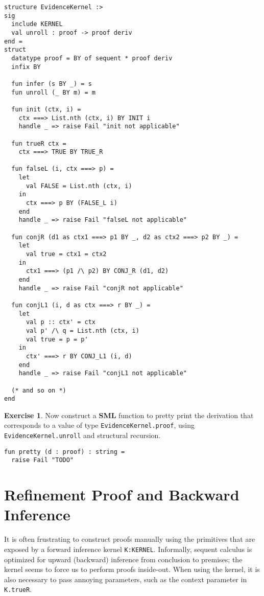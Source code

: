 \documentclass{article}
\newcommand\FormatLang[1]{{\bfseries\sffamily #1}}
\newcommand\SML{\FormatLang{SML}}
\theoremstyle{definition}
\newtheorem{exercise}{Exercise}[section]
\theoremstyle{remark}
\begin{document}
\begin{verbatim}
structure EvidenceKernel :>
sig
  include KERNEL
  val unroll : proof -> proof deriv
end =
struct
  datatype proof = BY of sequent * proof deriv
  infix BY

  fun infer (s BY _) = s
  fun unroll (_ BY m) = m

  fun init (ctx, i) =
    ctx ===> List.nth (ctx, i) BY INIT i
    handle _ => raise Fail "init not applicable"

  fun trueR ctx =
    ctx ===> TRUE BY TRUE_R

  fun falseL (i, ctx ===> p) =
    let
      val FALSE = List.nth (ctx, i)
    in
      ctx ===> p BY (FALSE_L i)
    end
    handle _ => raise Fail "falseL not applicable"

  fun conjR (d1 as ctx1 ===> p1 BY _, d2 as ctx2 ===> p2 BY _) =
    let
      val true = ctx1 = ctx2
    in
      ctx1 ===> (p1 /\ p2) BY CONJ_R (d1, d2)
    end
    handle _ => raise Fail "conjR not applicable"

  fun conjL1 (i, d as ctx ===> r BY _) =
    let
      val p :: ctx' = ctx
      val p' /\ q = List.nth (ctx, i)
      val true = p = p'
    in
      ctx' ===> r BY CONJ_L1 (i, d)
    end
    handle _ => raise Fail "conjL1 not applicable"

  (* and so on *)
end
\end{verbatim}

\begin{exercise}
  Now construct a \SML{} function to pretty print the derivation that
  corresponds to a value of type \verb|EvidenceKernel.proof|, using
  \verb|EvidenceKernel.unroll| and structural recursion.
\begin{verbatim}
fun pretty (d : proof) : string =
  raise Fail "TODO"
\end{verbatim}
\end{exercise}


\section{Refinement Proof and Backward Inference}

It is often frustrating to construct proofs manually using the
primitives that are exposed by a forward inference kernel
\verb|K:KERNEL|. Informally, sequent calculus is optimized for upward
(backward) inference from conclusion to premises; the kernel seems to
force us to perform proofs inside-out. When using the kernel, it is
also necessary to pass annoying parameters, such as the context
parameter in \verb|K.trueR|.
\end{document}
